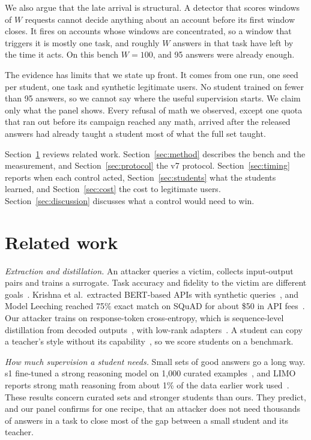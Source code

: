 \documentclass[journal]{IEEEtran}
\begin{document}
We also argue that the late arrival is structural. A detector that scores windows of $W$ requests cannot decide anything about an account before its first window closes. It fires on accounts whose windows are concentrated, so a window that triggers it is mostly one task, and roughly $W$ answers in that task have left by the time it acts. On this bench $W=100$, and 95 answers were already enough.

The evidence has limits that we state up front. It comes from one run, one seed per student, one task and synthetic legitimate users. No student trained on fewer than 95 answers, so we cannot say where the useful supervision starts. We claim only what the panel shows. Every refusal of math we observed, except one quota that ran out before its campaign reached any math, arrived after the released answers had already taught a student most of what the full set taught.

Section~\ref{sec:related} reviews related work. Section~\ref{sec:method} describes the bench and the measurement, and Section~\ref{sec:protocol} the v7 protocol. Section~\ref{sec:timing} reports when each control acted, Section~\ref{sec:students} what the students learned, and Section~\ref{sec:cost} the cost to legitimate users. Section~\ref{sec:discussion} discusses what a control would need to win.

\section{Related work}
\label{sec:related}
\textit{Extraction and distillation.} An attacker queries a victim, collects input-output pairs and trains a surrogate. Task accuracy and fidelity to the victim are different goals~\cite{jagielski2020high}. Krishna et al.\ extracted BERT-based APIs with synthetic queries~\cite{krishna2020thieves}, and Model Leeching reached 75\% exact match on SQuAD for about \$50 in API fees~\cite{birch2023leeching}. Our attacker trains on response-token cross-entropy, which is sequence-level distillation from decoded outputs~\cite{kim2016sequence}, with low-rank adapters~\cite{hu2022lora}. A student can copy a teacher's style without its capability~\cite{gudibande2024false}, so we score students on a benchmark.

\textit{How much supervision a student needs.} Small sets of good answers go a long way. s1 fine-tuned a strong reasoning model on 1,000 curated examples~\cite{muennighoff2025s1}, and LIMO reports strong math reasoning from about 1\% of the data earlier work used~\cite{ye2025limo}. These results concern curated sets and stronger students than ours. They predict, and our panel confirms for one recipe, that an attacker does not need thousands of answers in a task to close most of the gap between a small student and its teacher.
\end{document}
